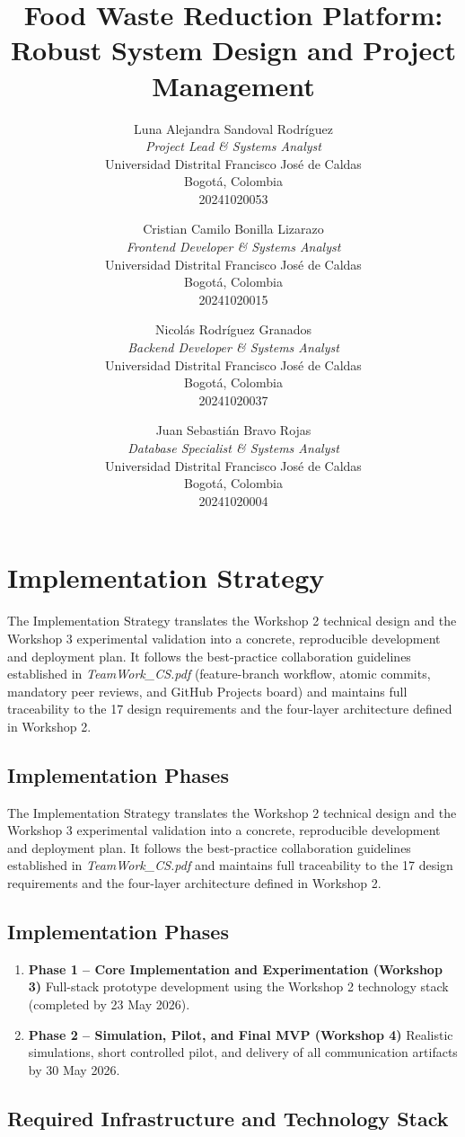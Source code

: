\documentclass[9pt,conference]{IEEEtran}
\title{Food Waste Reduction Platform: Robust System Design and Project Management}
\author{
Luna Alejandra Sandoval Rodríguez \\
\textit{Project Lead \& Systems Analyst} \\
Universidad Distrital Francisco José de Caldas \\
Bogotá, Colombia \\
20241020053
\and
Cristian Camilo Bonilla Lizarazo \\
\textit{Frontend Developer \& Systems Analyst} \\
Universidad Distrital Francisco José de Caldas \\
Bogotá, Colombia \\
20241020015
\and
Nicolás Rodríguez Granados \\
\textit{Backend Developer \& Systems Analyst} \\
Universidad Distrital Francisco José de Caldas \\
Bogotá, Colombia \\
20241020037
\and
Juan Sebastián Bravo Rojas \\
\textit{Database Specialist \& Systems Analyst} \\
Universidad Distrital Francisco José de Caldas \\
Bogotá, Colombia \\
20241020004
}
\begin{document}
\maketitle

\section{Implementation Strategy}
The Implementation Strategy translates the Workshop 2 technical design and the Workshop 3 experimental validation into a concrete, reproducible development and deployment plan. It follows the best-practice collaboration guidelines established in \textit{TeamWork\_CS.pdf} (feature-branch workflow, atomic commits, mandatory peer reviews, and GitHub Projects board) and maintains full traceability to the 17 design requirements and the four-layer architecture defined in Workshop 2.

\subsection{Implementation Phases}

The Implementation Strategy translates the Workshop 2 technical design and the Workshop 3 experimental validation into a concrete, reproducible development and deployment plan. It follows the best-practice collaboration guidelines established in \textit{TeamWork\_CS.pdf} and maintains full traceability to the 17 design requirements and the four-layer architecture defined in Workshop 2.

\subsection{Implementation Phases}

\begin{enumerate}
    \item \textbf{Phase 1 – Core Implementation and Experimentation (Workshop 3)}  
    Full-stack prototype development using the Workshop 2 technology stack (completed by 23 May 2026).

    \item \textbf{Phase 2 – Simulation, Pilot, and Final MVP (Workshop 4)}  
    Realistic simulations, short controlled pilot, and delivery of all communication artifacts by 30 May 2026.
\end{enumerate}

\subsection{Required Infrastructure and Technology Stack}
\end{document}

